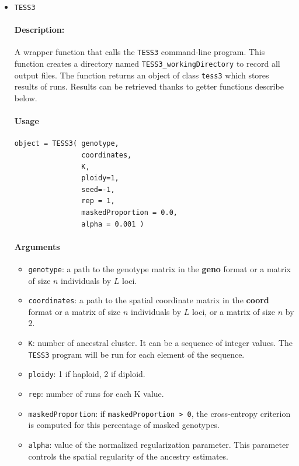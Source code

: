 \documentclass[10pt,a4paper]{article}
\begin{document}
\begin{itemize}

\item \verb|TESS3|

\paragraph{Description:}
A wrapper function that calls the {\tt TESS3} command-line program. This function creates a directory named \verb|TESS3_workingDirectory| to record all output files. The function returns an object of class \verb|tess3| which stores results of runs. Results can be retrieved thanks to getter functions describe below.
\paragraph{Usage}
\begin{Verbatim}
object = TESS3( genotype,
                coordinates,
                K,
                ploidy=1,
                seed=-1, 
                rep = 1, 
                maskedProportion = 0.0, 
                alpha = 0.001 )
\end{Verbatim}
\paragraph{Arguments}
\begin{itemize}
\item \verb|genotype|: a path to the genotype matrix in the {\bf geno} format or a matrix of size $n$ individuals by $L$ loci. 
\item \verb|coordinates|: a path to the spatial coordinate matrix in the {\bf coord} format or a matrix of size $n$ individuals by $L$ loci, or a matrix of size $n$ by $2$. 
\item \verb|K|: number of ancestral cluster. It can be a sequence of integer values. The {\tt TESS3} program will be run for each element of the sequence.
\item \verb|ploidy|: 1 if haploid, 2 if diploid.
\item \verb|rep|: number of runs for each K value.
\item \verb|maskedProportion|: if \verb|maskedProportion > 0|, the cross-entropy criterion is computed for this percentage of masked genotypes.
\item \verb|alpha|: value of the normalized regularization parameter. This parameter controls the spatial regularity of the ancestry estimates.
\end{itemize}


\end{itemize}
\end{document}
